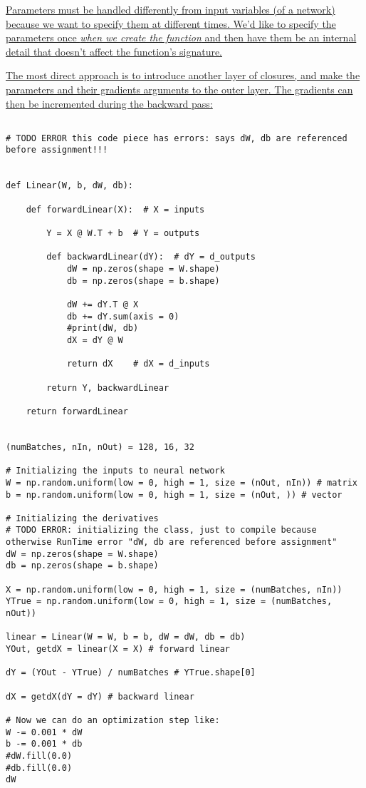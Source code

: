\documentclass[
]{article}
\begin{document}
\href{https://hyp.is/MgSHrk53EeqvG1tywXRcJg/thinc.ai/docs/concept}{Parameters
must be handled differently from input variables (of a network) because
we want to specify them at different times. We'd like to specify the
parameters once \emph{when we create the function} and then have them be
an internal detail that doesn't affect the function's signature.}

\href{https://hyp.is/mz0GKnv9Eeq3Jg9d-UOOhA/thinc.ai/docs/concept}{The
most direct approach is to introduce another layer of closures, and make
the parameters and their gradients arguments to the outer layer. The
gradients can then be incremented during the backward pass:}

\begin{verbatim}

# TODO ERROR this code piece has errors: says dW, db are referenced before assignment!!!


def Linear(W, b, dW, db):

    def forwardLinear(X):  # X = inputs

        Y = X @ W.T + b  # Y = outputs

        def backwardLinear(dY):  # dY = d_outputs
            dW = np.zeros(shape = W.shape)
            db = np.zeros(shape = b.shape)

            dW += dY.T @ X
            db += dY.sum(axis = 0)
            #print(dW, db)
            dX = dY @ W

            return dX    # dX = d_inputs

        return Y, backwardLinear

    return forwardLinear


(numBatches, nIn, nOut) = 128, 16, 32

# Initializing the inputs to neural network
W = np.random.uniform(low = 0, high = 1, size = (nOut, nIn)) # matrix
b = np.random.uniform(low = 0, high = 1, size = (nOut, )) # vector

# Initializing the derivatives
# TODO ERROR: initializing the class, just to compile because otherwise RunTime error "dW, db are referenced before assignment"
dW = np.zeros(shape = W.shape)
db = np.zeros(shape = b.shape)

X = np.random.uniform(low = 0, high = 1, size = (numBatches, nIn))
YTrue = np.random.uniform(low = 0, high = 1, size = (numBatches, nOut))

linear = Linear(W = W, b = b, dW = dW, db = db)
YOut, getdX = linear(X = X) # forward linear

dY = (YOut - YTrue) / numBatches # YTrue.shape[0]

dX = getdX(dY = dY) # backward linear

# Now we can do an optimization step like:
W -= 0.001 * dW
b -= 0.001 * db
#dW.fill(0.0)
#db.fill(0.0)
dW
\end{verbatim}
\end{document}
